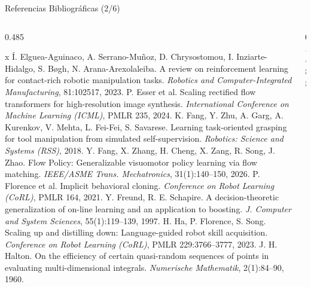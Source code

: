 \documentclass[aspectratio=169,10pt,xcolor={dvipsnames,table}]{beamer}
\begin{document}
\begin{frame}{Referencias Bibliográficas (2/6)}
  \begin{columns}[T, onlytextwidth]
    \begin{column}{0.485\textwidth}
      \RefsFont
      \begin{thebibliography}{x}\setlength{\itemsep}{0.8pt}
         Í. Elguea-Aguinaco, A. Serrano-Muñoz, D. Chrysostomou, I. Inziarte-Hidalgo, S. Bøgh, N. Arana-Arexolaleiba. \newblock A review on reinforcement learning for contact-rich robotic manipulation tasks. \newblock \emph{Robotics and Computer-Integrated Manufacturing}, 81:102517, 2023.
         P. Esser et al. \newblock Scaling rectified flow transformers for high-resolution image synthesis. \newblock \emph{International Conference on Machine Learning (ICML)}, PMLR 235, 2024.
         K. Fang, Y. Zhu, A. Garg, A. Kurenkov, V. Mehta, L. Fei-Fei, S. Savarese. \newblock Learning task-oriented grasping for tool manipulation from simulated self-supervision. \newblock \emph{Robotics: Science and Systems (RSS)}, 2018.
         Y. Fang, X. Zhang, H. Cheng, X. Zang, R. Song, J. Zhao. \newblock Flow Policy: Generalizable visuomotor policy learning via flow matching. \newblock \emph{IEEE/ASME Trans. Mechatronics}, 31(1):140--150, 2026.
         P. Florence et al. \newblock Implicit behavioral cloning. \newblock \emph{Conference on Robot Learning (CoRL)}, PMLR 164, 2021.
         Y. Freund, R. E. Schapire. \newblock A decision-theoretic generalization of on-line learning and an application to boosting. \newblock \emph{J. Computer and System Sciences}, 55(1):119--139, 1997.
         H. Ha, P. Florence, S. Song. \newblock Scaling up and distilling down: Language-guided robot skill acquisition. \newblock \emph{Conference on Robot Learning (CoRL)}, PMLR 229:3766--3777, 2023.
         J. H. Halton. \newblock On the efficiency of certain quasi-random sequences of points in evaluating multi-dimensional integrals. \newblock \emph{Numerische Mathematik}, 2(1):84--90, 1960.
      \end{thebibliography}
    \end{column}
    \begin{column}{0.485\textwidth}
      \RefsFont

\end{column}
\end{columns}
\end{frame}
\end{document}
